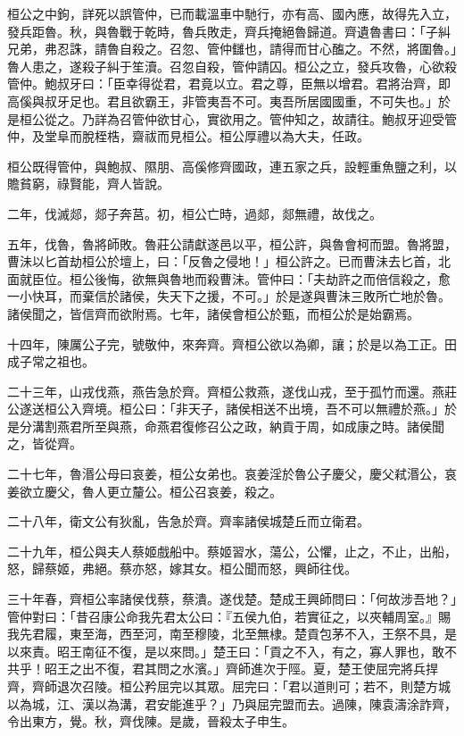\begin{pinyinscope}
桓公之中鉤，詳死以誤管仲，已而載溫車中馳行，亦有高、國內應，故得先入立，發兵距魯。秋，與魯戰于乾時，魯兵敗走，齊兵掩絕魯歸道。齊遺魯書曰：「子糾兄弟，弗忍誅，請魯自殺之。召忽、管仲讎也，請得而甘心醢之。不然，將圍魯。」魯人患之，遂殺子糾于笙瀆。召忽自殺，管仲請囚。桓公之立，發兵攻魯，心欲殺管仲。鮑叔牙曰：「臣幸得從君，君竟以立。君之尊，臣無以增君。君將治齊，即高傒與叔牙足也。君且欲霸王，非管夷吾不可。夷吾所居國國重，不可失也。」於是桓公從之。乃詳為召管仲欲甘心，實欲用之。管仲知之，故請往。鮑叔牙迎受管仲，及堂阜而脫桎梏，齋祓而見桓公。桓公厚禮以為大夫，任政。

桓公既得管仲，與鮑叔、隰朋、高傒修齊國政，連五家之兵，設輕重魚鹽之利，以贍貧窮，祿賢能，齊人皆說。

二年，伐滅郯，郯子奔莒。初，桓公亡時，過郯，郯無禮，故伐之。

五年，伐魯，魯將師敗。魯莊公請獻遂邑以平，桓公許，與魯會柯而盟。魯將盟，曹沬以匕首劫桓公於壇上，曰：「反魯之侵地！」桓公許之。已而曹沬去匕首，北面就臣位。桓公後悔，欲無與魯地而殺曹沬。管仲曰：「夫劫許之而倍信殺之，愈一小快耳，而棄信於諸侯，失天下之援，不可。」於是遂與曹沬三敗所亡地於魯。諸侯聞之，皆信齊而欲附焉。七年，諸侯會桓公於甄，而桓公於是始霸焉。

十四年，陳厲公子完，號敬仲，來奔齊。齊桓公欲以為卿，讓；於是以為工正。田成子常之祖也。

二十三年，山戎伐燕，燕告急於齊。齊桓公救燕，遂伐山戎，至于孤竹而還。燕莊公遂送桓公入齊境。桓公曰：「非天子，諸侯相送不出境，吾不可以無禮於燕。」於是分溝割燕君所至與燕，命燕君復修召公之政，納貢于周，如成康之時。諸侯聞之，皆從齊。

二十七年，魯湣公母曰哀姜，桓公女弟也。哀姜淫於魯公子慶父，慶父弒湣公，哀姜欲立慶父，魯人更立釐公。桓公召哀姜，殺之。

二十八年，衛文公有狄亂，告急於齊。齊率諸侯城楚丘而立衛君。

二十九年，桓公與夫人蔡姬戲船中。蔡姬習水，蕩公，公懼，止之，不止，出船，怒，歸蔡姬，弗絕。蔡亦怒，嫁其女。桓公聞而怒，興師往伐。

三十年春，齊桓公率諸侯伐蔡，蔡潰。遂伐楚。楚成王興師問曰：「何故涉吾地？」管仲對曰：「昔召康公命我先君太公曰：『五侯九伯，若實征之，以夾輔周室。』賜我先君履，東至海，西至河，南至穆陵，北至無棣。楚貢包茅不入，王祭不具，是以來責。昭王南征不復，是以來問。」楚王曰：「貢之不入，有之，寡人罪也，敢不共乎！昭王之出不復，君其問之水濱。」齊師進次于陘。夏，楚王使屈完將兵捍齊，齊師退次召陵。桓公矜屈完以其眾。屈完曰：「君以道則可；若不，則楚方城以為城，江、漢以為溝，君安能進乎？」乃與屈完盟而去。過陳，陳袁濤涂詐齊，令出東方，覺。秋，齊伐陳。是歲，晉殺太子申生。


\end{pinyinscope}
